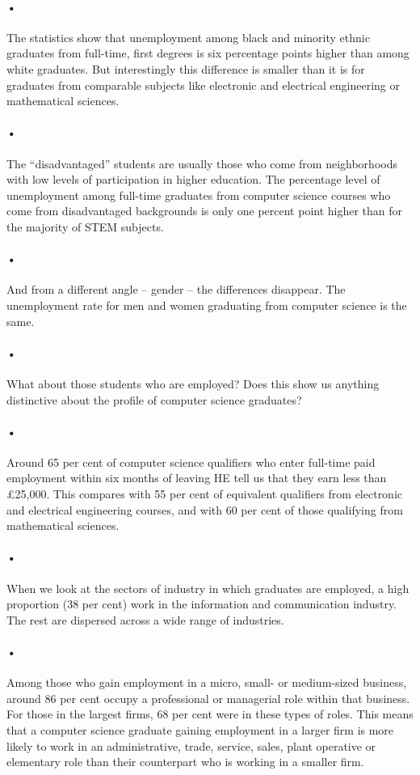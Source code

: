\documentclass[12pt]{article}
\begin{document}
\paragraph{•}
The statistics show that unemployment among black and minority ethnic graduates from full-time, first degrees is six percentage points higher than among white graduates. But interestingly this difference is smaller than it is for graduates from comparable subjects like electronic and electrical engineering or mathematical sciences. 
\paragraph{•}
The “disadvantaged” students are usually those who come from neighborhoods with low levels of participation in higher education. The percentage level of unemployment among full-time graduates from computer science courses who come from disadvantaged backgrounds is only one percent point higher than for the majority of STEM subjects. 
\paragraph{•}
And from a different angle – gender – the differences disappear. The unemployment rate for men and women graduating from computer science is the same.
\paragraph{•}
What about those students who are employed? Does this show us anything distinctive about the profile of computer science graduates? 
\paragraph{•}
Around 65 per cent of computer science qualifiers who enter full-time paid employment within six months of leaving HE tell us that they earn less than £25,000. This compares with 55 per cent of equivalent qualifiers from electronic and electrical engineering courses, and with 60 per cent of those qualifying from mathematical sciences. 
\paragraph{•}
When we look at the sectors of industry in which graduates are employed, a high proportion (38 per cent) work in the information and communication industry. The rest are dispersed across a wide range of industries. 
\paragraph{•}
Among those who gain employment in a micro, small- or medium-sized business, around 86 per cent occupy a professional or managerial role within that business. For those in the largest firms, 68 per cent were in these types of roles. This means that a computer science graduate gaining employment in a larger firm is more likely to work in an administrative, trade, service, sales, plant operative or elementary role than their counterpart who is working in a smaller firm. 
\end{document}
